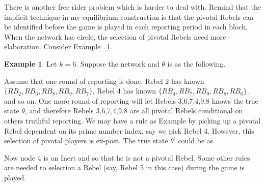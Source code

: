 \documentclass[12pt,letter]{article}
\theoremstyle{definition}
\newtheorem{example}{Example}[section]
\theoremstyle{remark}
\theoremstyle{claim}
\begin{document}
There is another free rider problem which is harder to deal with. Remind that the implicit technique in my equilibrium construction is that the pivotal Rebels can be identified before the game is played in each reporting period in each block. When the network has circle, the selection of pivotal Rebels need more elaboration. Consider Example ~\ref{ex_free_rider_circle}.
\begin{example}\label{ex_free_rider_circle}
Let $k=6$. Suppose the network and $\theta$ is as the following. 

\begin{center}
\end{center}

Assume that one round of reporting is done. Rebel 2 has known $\{RB_2,RB_6,RB_8,RB_9,RB_7\}$, Rebel 4 has known $\{RB_4,RB_7,RB_9,RB_8,RB_6\}$, and so on. One more round of reporting will let Rebels 3,6,7,4,9,8 knows the true state $\theta$, and therefore Rebels 3,6,7,4,9,8 are all pivotal Rebels conditional on others truthful reporting. We may have a rule as Example by picking up a pivotal Rebel dependent on its prime number index, say we pick Rebel 4. However, this selection of pivotal players is ex-post. The true state $\theta^{'}$ could be as 

\begin{center}
\end{center}

Now node 4 is an Inert and so that he is not a pivotal Rebel. Some other rules are needed to selection a Rebel (say, Rebel 5 in this case) during the game is played. 

\end{example}
\end{document}
